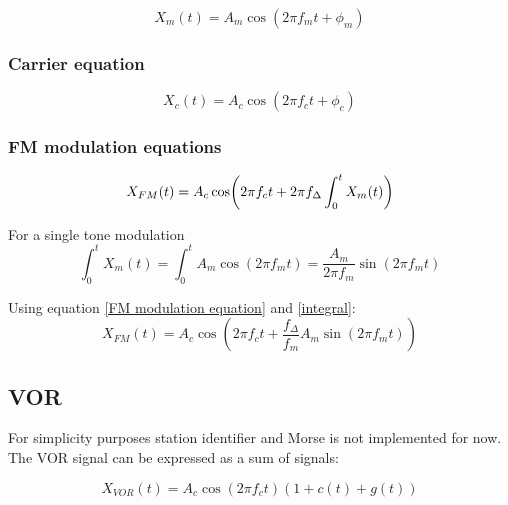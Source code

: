 \documentclass[12pt]{article}
\begin{document}
\begin{equation}
\label{Base tone equation fm}
X_{m}(t) = A_m \cos (2\pi f_m t + \phi_m)
\end{equation}

\subsubsection{Carrier equation}

\begin{equation}
\label{Carrier equation fm}
X_{c}(t) = A_c \cos (2\pi f_c t + \phi_c)
\end{equation}

\subsubsection{FM modulation equations}

\begin{equation}
\label{FM modulation equation}
X_{FM}(t) = A_c\cos(2\pi f_c t + 2\pi f_\Delta\\ \int_{0}^{t} X_m(t) )
\end{equation}

For a single tone modulation
\begin{equation}
\label{integral}
\int_{0}^{t} X_m(t) = \int_{0}^{t} A_m \cos (2\pi f_m t) = \frac{A_m}{2 \pi f_m} \sin(2 \pi f_m t)
\end{equation}

Using equation \eqref{FM modulation equation} and \eqref{integral}:
\begin{equation}
\label{final_fm_equation}
X_{FM}(t) = A_c\cos(2\pi f_c t + \frac{f_\Delta}{f_m}A_m \sin(2 \pi f_m t))
\end{equation}

\newpage
\subsection{VOR}
For simplicity purposes station identifier and Morse is not implemented for now. 
The VOR signal can be expressed as a sum of signals:

\begin{equation}
\label{VOR signal}
X_{VOR}(t) = A_c \cos (2 \pi f_c t)(1 + c(t) + g(t))
\end{equation}
\end{document}
